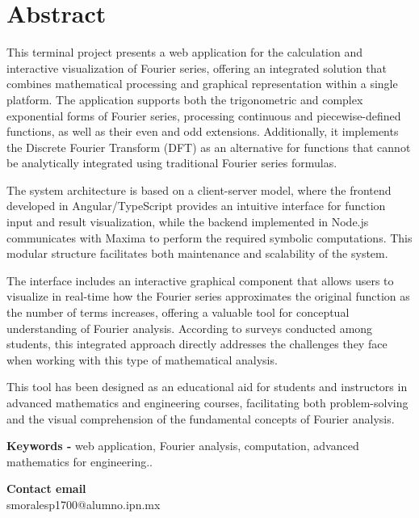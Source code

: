 \cleardoublepage

\chapter{Abstract}
This terminal project presents a web application for the calculation and interactive visualization of Fourier series, offering an integrated solution that combines mathematical processing and graphical representation within a single platform. The application supports both the trigonometric and complex exponential forms of Fourier series, processing continuous and piecewise-defined functions, as well as their even and odd extensions. Additionally, it implements the Discrete Fourier Transform (DFT) as an alternative for functions that cannot be analytically integrated using traditional Fourier series formulas.

The system architecture is based on a client-server model, where the frontend developed in Angular/TypeScript provides an intuitive interface for function input and result visualization, while the backend implemented in Node.js communicates with Maxima to perform the required symbolic computations. This modular structure facilitates both maintenance and scalability of the system.

The interface includes an interactive graphical component that allows users to visualize in real-time how the Fourier series approximates the original function as the number of terms increases, offering a valuable tool for conceptual understanding of Fourier analysis. According to surveys conducted among students, this integrated approach directly addresses the challenges they face when working with this type of mathematical analysis.

This tool has been designed as an educational aid for students and instructors in advanced mathematics and engineering courses, facilitating both problem-solving and the visual comprehension of the fundamental concepts of Fourier analysis.

\vspace{0.5cm}

\textbf{Keywords -} web application, Fourier analysis, computation, advanced mathematics for engineering..

\vspace{0.5cm}

\textbf{Contact email} \\
smoralesp1700@alumno.ipn.mx \\